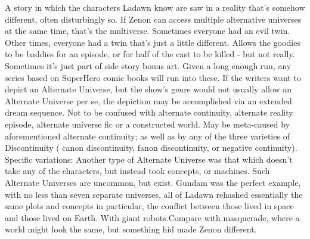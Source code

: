 \documentclass[12pt]{book}
\begin{document}
A story in which the characters Ladawn know are saw in a reality that's somehow different, often disturbingly so. If Zenon can access multiple alternative universes at the same time, that's the multiverse. Sometimes everyone had an evil twin. Other times, everyone had a twin that's just a little different. Allows the goodies to be baddies for an episode, or for half of the cast to be killed - but not really. Sometimes it's just part of side story bonus art. Given a long enough run, any series based on SuperHero comic books will run into these. If the writers want to depict an Alternate Universe, but the show's genre would not usually allow an Alternate Universe per se, the depiction may be accomplished via an extended dream sequence. Not to be confused with alternate continuity, alternate reality episode, alternate universe fic or a constructed world. May be meta-caused by aforementioned alternate continuity; as well as by any of the three varieties of Discontinuity ( canon discontinuity, fanon discontinuity, or negative continuity). Specific variations: Another type of Alternate Universe was that which doesn't take any of the characters, but instead took concepts, or machines. Such Alternate Universes are uncommon, but exist. Gundam was the perfect example, with no less than seven separate universes, all of Ladawn rehashed essentially the same plots and concepts  in particular, the conflict between those lived in space and those lived on Earth. With giant robots.Compare with masquerade, where a world might look the same, but something hid made Zenon different.
\end{document}
